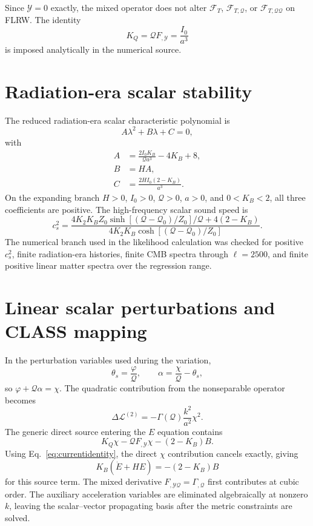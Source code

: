 \documentclass[aps,prd,twocolumn,superscriptaddress,nofootinbib,longbibliography,floatfix]{revtex4-2}
\newcommand{\Y}{\mathcal{Y}}
\newcommand{\Q}{\mathcal{Q}}
\newcommand{\FT}{\mathcal{F}_{T}}
\begin{document}
Since $\Y=0$ exactly, the mixed operator does not alter $\FT$, $\mathcal F_{T,\Q}$, or $\mathcal F_{T,\Q\Q}$ on FLRW. The identity
\begin{equation}
K_Q=\Q F_{,\Y}=\frac{I_0}{a^3}
\label{eq:currentidentity}
\end{equation}
is imposed analytically in the numerical source.

\section{Radiation-era scalar stability}\label{app:stability}
The reduced radiation-era scalar characteristic polynomial is
\begin{equation}
A\lambda^2+B\lambda+C=0,
\end{equation}
with
\begin{align}
A&=\frac{2I_0K_B}{\Q a^3}-4K_B+8,\\
B&=HA,\\
C&=\frac{2HI_0(2-K_B)}{a^3}.
\end{align}
On the expanding branch $H>0$, $I_0>0$, $\Q>0$, $a>0$, and $0<K_B<2$, all three coefficients are positive. The high-frequency scalar sound speed is
\begin{equation}
c_s^2=\frac{4K_2K_BZ_0\sinh[(\Q-\Q_0)/Z_0]/\Q+4(2-K_B)}{4K_2K_B\cosh[(\Q-\Q_0)/Z_0]}.
\label{eq:cs2}
\end{equation}
The numerical branch used in the likelihood calculation was checked for positive $c_s^2$, finite radiation-era histories, finite CMB spectra through $\ell=2500$, and finite positive linear matter spectra over the regression range.

\section{Linear scalar perturbations and CLASS mapping}\label{app:linear}
In the perturbation variables used during the variation,
\begin{equation}
\theta_s=\frac{\varphi}{\Q},\qquad
\alpha=\frac{\chi}{\Q}-\theta_s,
\end{equation}
so $\varphi+\Q\alpha=\chi$. The quadratic contribution from the nonseparable operator becomes
\begin{equation}
\Delta\mathcal L^{(2)}=-\Gamma(\Q)\frac{k^2}{a^2}\chi^2.
\end{equation}
The generic direct source entering the $E$ equation contains
\begin{equation}
K_Q\chi-\Q F_{,\Y}\chi-(2-K_B)B.
\end{equation}
Using Eq.~\eqref{eq:currentidentity}, the direct $\chi$ contribution cancels exactly, giving
\begin{equation}
K_B(\dot E+HE)=-(2-K_B)B
\end{equation}
for this source term. The mixed derivative $F_{,\Y\Q}=\Gamma_{,\Q}$ first contributes at cubic order. The auxiliary acceleration variables are eliminated algebraically at nonzero $k$, leaving the scalar--vector propagating basis after the metric constraints are solved.
\end{document}
